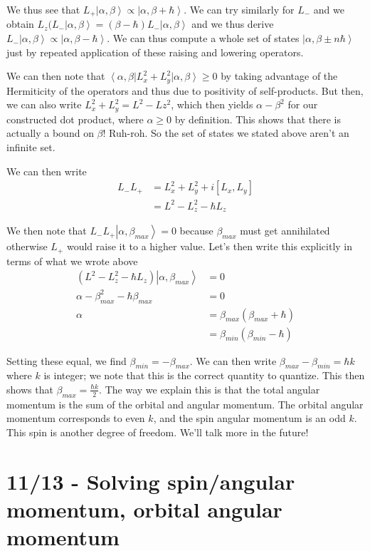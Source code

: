 \documentclass[10pt]{report}
\newcommand{\bra}[1]{\left<#1\right|}
\newcommand{\ket}[1]{\left|#1\right>}
\begin{document}
We thus see that $L_+\ket{\alpha,\beta} \propto \ket{\alpha,\beta + \hbar}$. We can try similarly for $L_-$ and we obtain $L_z(L_-\ket{\alpha,\beta} = (\beta - \hbar)L_-\ket{\alpha,\beta}$ and we thus derive $L_-\ket{\alpha,\beta} \propto \ket{\alpha,\beta-\hbar}$. We can thus compute a whole set of states $\ket{\alpha, \beta \pm n\hbar}$ just by repeated application of these raising and lowering operators.

We can then note that $\bra{\alpha,\beta} L_x^2 + L_y^2 \ket{\alpha,\beta} \geq 0$ by taking advantage of the Hermiticity of the operators and thus due to positivity of self-products. But then, we can also write $L_x^2 + L_y^2 = L^2 - Lz^2$, which then yields $\alpha - \beta^2$ for our constructed dot product, where $\alpha \geq 0$ by definition. This shows that there is actually a bound on $\beta$! Ruh-roh. So the set of states we stated above aren't an infinite set.

We can then write 
\begin{align}
	L_- L_+ &= L_x^2 + L_y^2 + i\left[ L_x, L_y \right]\\
	&= L^2 - L_z^2 - \hbar L_z
\end{align}

We then note that $L_- L_+ \ket{\alpha,\beta_{max}} = 0$ because $\beta_{max}$ must get annihilated otherwise $L_+$ would raise it to a higher value. Let's then write this explicitly in terms of what we wrote above
\begin{align}
	\left(L^2 - L_z^2 - \hbar L_z\right)\ket{\alpha,\beta_{max}} &= 0\\
	\alpha - \beta_{max}^2 -\hbar \beta_{max} &= 0\\
	\alpha &= \beta_{max}(\beta_{max} + \hbar)\\
	&= \beta_{min}\left( \beta_{min} - \hbar \right)
\end{align}

Setting these equal, we find $\beta_{min} = -\beta_{max}$. We can then write $\beta_{max} - \beta_{min} = \hbar k$ where $k$ is integer; we note that this is the correct quantity to quantize. This then shows that $\beta_{max} = \frac{\hbar k}{2}$. The way we explain this is that the total angular momentum is the sum of the orbital and angular momentum. The orbital angular momentum corresponds to even $k$, and the spin angular momentum is an odd $k$. This spin is another degree of freedom. We'll talk more in the future!

\chapter{11/13 - Solving spin/angular momentum, orbital angular momentum}
\end{document}
